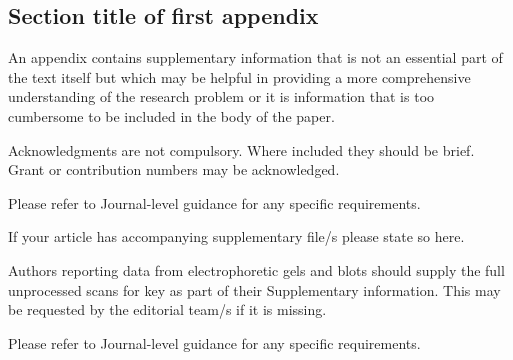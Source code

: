 \begin{appendices}

\section{Section title of first appendix}\label{secA1}

An appendix contains supplementary information that is not an essential part of the text itself but which may be helpful in providing a more comprehensive understanding of the research problem or it is information that is too cumbersome to be included in the body of the paper.




\end{appendices}



Acknowledgments are not compulsory. Where included they should be brief. Grant or contribution numbers may be acknowledged.

Please refer to Journal-level guidance for any specific requirements.



If your article has accompanying supplementary file/s please state so here. 

Authors reporting data from electrophoretic gels and blots should supply the full unprocessed scans for key as part of their Supplementary information. This may be requested by the editorial team/s if it is missing.

Please refer to Journal-level guidance for any specific requirements.